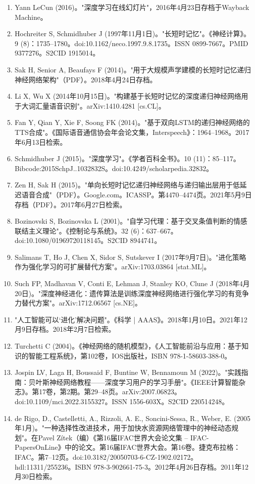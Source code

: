 \begin{enumerate}
\item Yann LeCun (2016)。"深度学习在线幻灯片"，2016年4月23日存档于Wayback Machine。
\item Hochreiter S, Schmidhuber J (1997年11月1日)。"长短时记忆"。《神经计算》。9 (8)：1735–1780。doi:10.1162/neco.1997.9.8.1735。ISSN 0899-7667。PMID 9377276。S2CID 1915014。
\item Sak H, Senior A, Beaufays F (2014)。"用于大规模声学建模的长短时记忆递归神经网络架构"（PDF）。2018年4月24日存档。
\item Li X, Wu X (2014年10月15日)。"构建基于长短时记忆的深度递归神经网络用于大词汇量语音识别"。arXiv:1410.4281 [cs.CL]。
\item Fan Y, Qian Y, Xie F, Soong FK (2014)。"基于双向LSTM的递归神经网络的TTS合成"。《国际语音通信协会年会论文集，Interspeech》：1964–1968。2017年6月13日检索。
\item Schmidhuber J (2015)。"深度学习"。《学者百科全书》。10 (11)：85–117。Bibcode:2015SchpJ..1032832S。doi:10.4249/scholarpedia.32832。
\item Zen H, Sak H (2015)。"单向长短时记忆递归神经网络与递归输出层用于低延迟语音合成"（PDF）。Google.com。ICASSP。第4470–4474页。2021年5月9日存档（PDF）。2017年6月27日检索。
\item Bozinovski S, Bozinovska L (2001)。"自学习代理：基于交叉条值判断的情感联结主义理论"。《控制论与系统》。32 (6)：637–667。doi:10.1080/01969720118145。S2CID 8944741。
\item Salimans T, Ho J, Chen X, Sidor S, Sutskever I (2017年9月7日)。"进化策略作为强化学习的可扩展替代方案"。arXiv:1703.03864 [stat.ML]。
\item Such FP, Madhavan V, Conti E, Lehman J, Stanley KO, Clune J (2018年4月20日)。"深度神经进化：遗传算法是训练深度神经网络进行强化学习的有竞争力替代方案"。arXiv:1712.06567 [cs.NE]。
\item "人工智能可以‘进化’解决问题"。《科学 | AAAS》。2018年1月10日。2021年12月9日存档。2018年2月7日检索。
\item Turchetti C (2004)。《神经网络的随机模型》，《人工智能前沿与应用：基于知识的智能工程系统》，第102卷，IOS出版社，ISBN 978-1-58603-388-0。
\item Jospin LV, Laga H, Boussaid F, Buntine W, Bennamoun M (2022)。"实践指南：贝叶斯神经网络教程——深度学习用户的学习手册"。《IEEE计算智能杂志》。第17卷，第2期。第29–48页。arXiv:2007.06823。doi:10.1109/mci.2022.3155327。ISSN 1556-603X。S2CID 220514248。
\item de Rigo, D., Castelletti, A., Rizzoli, A. E., Soncini-Sessa, R., Weber, E. (2005年1月)。"一种选择性改进技术，用于加快水资源网络管理中的神经动态规划"。在Pavel Zítek（编）《第16届IFAC世界大会论文集 – IFAC-PapersOnLine》中的论文。第16届IFAC世界大会。第16卷。捷克布拉格：IFAC。第7–12页。doi:10.3182/20050703-6-CZ-1902.02172。hdl:11311/255236。ISBN 978-3-902661-75-3。2012年4月26日存档。2011年12月30日检索。

\end{enumerate}
